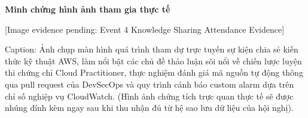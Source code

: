 \vspace{0.5em}\noindent\textbf{Minh chứng hình ảnh tham gia thực
tế}\par

{[}Image evidence pending: Event 4 Knowledge Sharing Attendance
Evidence{]}

Caption: Ảnh chụp màn hình quá trình tham dự trực tuyến sự kiện chia sẻ
kiến thức kỹ thuật AWS, làm nổi bật các chủ đề thảo luận sôi nổi về
chiến lược luyện thi chứng chỉ Cloud Practitioner, thực nghiệm đánh giá
mã nguồn tự động thông qua pull request của DevSecOps và quy trình cảnh
báo custom alarm dựa trên chỉ số nghiệp vụ CloudWatch. (Hình ảnh chứng
tích trực quan thực tế sẽ được nhúng đính kèm ngay sau khi thu nhận đủ
từ hệ sao lưu dữ liệu của hội nghị).
